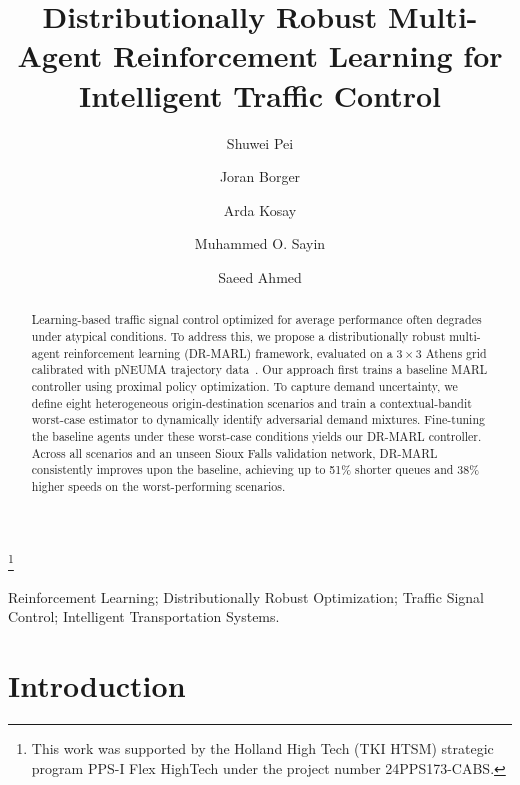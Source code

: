 \documentclass{ifacconf}
\newcommand{\1}{\mbox{1}\hspace{-0.25em}\mbox{l}}
\begin{document}
\begin{frontmatter}

\title{Distributionally Robust Multi-Agent Reinforcement Learning for Intelligent Traffic Control}

\thanks[footnoteinfo]{This work was supported by the Holland High Tech (TKI HTSM) strategic program PPS-I Flex HighTech under the project number 24PPS173-CABS.}

\author[CN]{Shuwei Pei}
\author[CN]{Joran Borger}
\author[TK]{Arda Kosay}
\author[TK]{Muhammed O. Sayin}
\author[CN]{Saeed Ahmed}



\address[CN]{Engineering and Technology institute Groningen, Faculty of Science and Engineering, University of Groningen, 9747 AG Groningen, the Netherlands (e-mails: s.pei@rug.nl, j.borger.3@student.rug.nl, s.ahmed@rug.nl)}

\address[TK]{Department of Electrical, Electronics Engineering, Bilkent University, TR-06800 Ankara, Turkey (e-mail: arda.kosay@bilkent.edu.tr, sayin@ee.bilkent.edu.tr)}

\begin{abstract}
Learning-based traffic signal control optimized for average performance often degrades under atypical conditions. To address this, we propose a distributionally robust multi-agent reinforcement learning (DR-MARL) framework, evaluated on a $3\times 3$ Athens grid calibrated with pNEUMA trajectory data~\citep{BarmpounakisGeroliminis2020}. Our approach first trains a baseline MARL controller using proximal policy optimization. To capture demand uncertainty, we define eight heterogeneous origin-destination scenarios and train a contextual-bandit worst-case estimator to dynamically identify adversarial demand mixtures. Fine-tuning the baseline agents under these worst-case conditions yields our DR-MARL controller. Across all scenarios and an unseen Sioux Falls validation network, DR-MARL consistently improves upon the baseline, achieving up to 51\% shorter queues and 38\% higher speeds on the worst-performing scenarios.
\end{abstract}

\begin{keyword}
Reinforcement Learning; Distributionally Robust Optimization; Traffic Signal Control; Intelligent Transportation Systems.
\end{keyword}

\end{frontmatter}

\section{Introduction}
\end{document}
